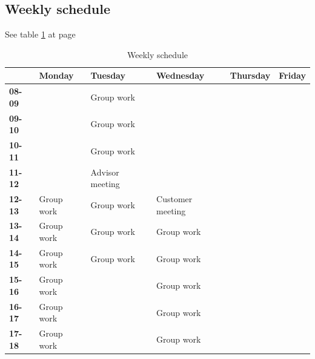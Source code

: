 \subsection{Weekly schedule}
See table \ref{tab:weeklyschedule} at page \pageref{tab:weeklyschedule}
\begin{table}
\begin{tabular}{l|l|l|l|l|l}
 & \textbf{Monday} & \textbf{Tuesday} & \textbf{Wednesday} & \textbf{Thursday} & \textbf{Friday} \\ \hline \hline
\textbf{08-09} &  & Group work &  &  &  \\ \hline
\textbf{09-10} &  & Group work &  &  &  \\ \hline
\textbf{10-11} &  & Group work &  &  &  \\ \hline
\textbf{11-12} &  & Advisor meeting & &  &  \\ \hline
\textbf{12-13} & Group work & Group work & Customer meeting &  &  \\ \hline
\textbf{13-14} & Group work & Group work & Group work &  &  \\ \hline
\textbf{14-15} & Group work & Group work & Group work &  &  \\ \hline
\textbf{15-16} & Group work &  & Group work &  &  \\ \hline
\textbf{16-17} & Group work &  & Group work &  &  \\ \hline
\textbf{17-18} & Group work &  & Group work &  & 
\end{tabular}
\caption {Weekly schedule} \label{tab:weeklyschedule}
\end{table}

